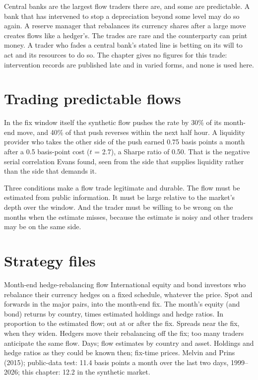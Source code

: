 Central banks are the largest flow traders there are, and some are predictable. A bank that has intervened to stop a depreciation beyond some level
may do so again. A reserve manager that rebalances its currency shares after a large move creates flows like a hedger's. The trades are rare and
the counterparty can print money. A trader who fades a central bank's stated line is betting on its will to act and its resources to do so. The chapter
gives no figures for this trade: intervention records are published late and in varied forms, and none is used here.

\section{Trading predictable flows}

In the fix window itself the synthetic flow pushes the rate by 30\% of its month-end move, and 40\% of that push reverses within the next half hour.
A liquidity provider who takes the other side of the push earned 0.75 basis points a month after a 0.5 basis-point cost ($t$ = 2.7), a Sharpe ratio of
0.50. That is the negative serial correlation Evans found, seen from the side that supplies liquidity rather than the side that demands it.

Three conditions make a flow trade legitimate and durable. The flow must be estimated from public information. It must be large relative to the
market's depth over the window. And the trader must be willing to be wrong on the months when the estimate misses, because the estimate is noisy and
other traders may be on the same side.

\section{Strategy files}

\begin{strategyfile}{Month-end hedge-rebalancing flow}\label{strat:s2:fx-flow-strategies:monthend}
 International equity and bond investors who rebalance their currency hedges on a fixed schedule, whatever the
price.
 Spot and forwards in the major pairs, into the month-end fix.
 The month's equity (and bond) returns by country, times estimated holdings and hedge ratios.
 In proportion to the estimated flow; out at or after the fix.
 Spreads near the fix, when they widen.
 Hedgers move their rebalancing off the fix; too many traders anticipate the same flow.
 Days; flow estimates by country and asset.
 Holdings and hedge ratios as they could be known then; fix-time prices.
 Melvin and Prins (2015); public-data test: 11.4 basis points a month over the last two days, 1999--2026; this chapter: 12.2 in the
synthetic market.
\end{strategyfile}


